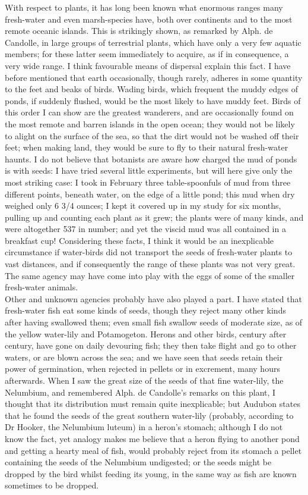 \indent With respect to plants, it has long been known what enormous ranges many fresh-water and even marsh-species have, both over continents and to the most remote oceanic islands. This is strikingly shown, as remarked by Alph. de Candolle, in large groups of terrestrial plants, which have only a very few aquatic members; for these latter seem immediately to acquire, as if in consequence, a very wide range.  I think favourable means of dispersal explain this fact. I have before mentioned that earth occasionally, though rarely, adheres in some quantity to the feet and beaks of birds. Wading birds, which frequent the muddy edges of ponds, if suddenly flushed, would be the most likely to have muddy feet. Birds of this order I can show are the greatest wanderers, and are occasionally found on the most remote and barren islands in the open ocean; they would not be likely to alight on the surface of the sea, so that the dirt would not be washed off their feet; when making land, they would be sure to fly to their natural fresh-water haunts. I do not believe that botanists are aware how charged the mud of ponds is with seeds: I have tried several little experiments, but will here give only the most striking case: I took in February three table-spoonfuls of mud from three different points, beneath water, on the edge of a little pond; this mud when dry weighed only 6 3/4 ounces; I kept it covered up in my study for six months, pulling up and counting each plant as it grew; the plants were of many kinds, and were altogether 537 in number; and yet the viscid mud was all contained in a breakfast cup! Considering these facts, I think it would be an inexplicable circumstance if water-birds did not transport the seeds of fresh-water plants to vast distances, and if consequently the range of these plants was not very great. The same agency may have come into play with the eggs of some of the smaller fresh-water animals.~\\
\indent Other and unknown agencies probably have also played a part. I have stated that fresh-water fish eat some kinds of seeds, though they reject many other kinds after having swallowed them; even small fish swallow seeds of moderate size, as of the yellow water-lily and Potamogeton. Herons and other birds, century after century, have gone on daily devouring fish; they then take flight and go to other waters, or are blown across the sea; and we have seen that seeds retain their power of germination, when rejected in pellets or in excrement, many hours afterwards. When I saw the great size of the seeds of that fine water-lily, the Nelumbium, and remembered Alph. de Candolle's remarks on this plant, I thought that its distribution must remain quite inexplicable; but Audubon states that he found the seeds of the great southern water-lily (probably, according to Dr Hooker, the Nelumbium luteum) in a heron's stomach; although I do not know the fact, yet analogy makes me believe that a heron flying to another pond and getting a hearty meal of fish, would probably reject from its stomach a pellet containing the seeds of the Nelumbium undigested; or the seeds might be dropped by the bird whilst feeding its young, in the same way as fish are known sometimes to be dropped.~\\
